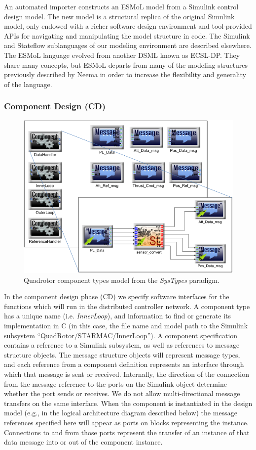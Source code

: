 An automated importer constructs an ESMoL model from a
Simulink control design model.  The new model is a structural
replica of the original Simulink model, only endowed with a 
richer software design environment and tool-provided APIs for 
navigating and manipulating the model structure in code.  
The Simulink and Stateflow sublanguages of our modeling 
environment are described elsewhere\cite{mic:ecsldp}.  
The ESMoL language evolved from another DSML known as 
ECSL-DP.  They share many
concepts, but ESMoL departs from many of the modeling
structures previously described by Neema in order to increase
the flexibility and generality of the language.

\subsubsection*{Component Design (CD)}

\begin{figure}
\centering
\includegraphics[width=0.85\columnwidth]{figures/quadrotor_types.png}
    \caption{Quadrotor component types model from the \emph{SysTypes} paradigm.}
    \label{fig:qr_types}
\end{figure}

In the component design phase (CD) we specify 
software interfaces for the functions which will run in the 
distributed controller network.  
A component type has a
unique name (i.e. \emph{InnerLoop}), and information to find or generate its
implementation in C (in this case, the file name and model path 
to the Simulink subsystem ``QuadRotor/STARMAC/InnerLoop'').
A component specification 
contains a reference to a Simulink subsystem,
as well as references to message structure objects. 
The message structure objects will represent message
types, and each reference from a component definition 
represents an interface through which that message
is sent or received.  Internally, the direction of 
the connection from the message reference to the ports
on the Simulink object determine whether the port 
sends or receives.  We do not allow multi-directional
message transfers on the same interface.  When the 
component is instantiated in the design model
(e.g., in the logical architecture diagram described 
below) the message references specified here will 
appear as ports on blocks representing the instance.  
Connections to and from those ports represent the transfer of 
an instance of that data message into or out of the component instance.

